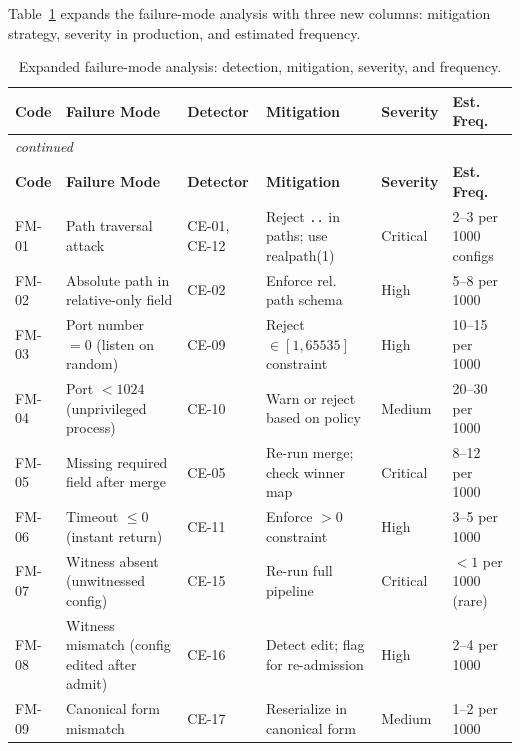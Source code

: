 Table~\ref{tab:failure-modes} expands the failure-mode analysis with three
new columns: mitigation strategy, severity in production, and estimated frequency.

\begin{longtable}{@{}p{1.5cm}p{2.0cm}p{2.2cm}p{2.0cm}p{2.0cm}p{2.2cm}@{}}
\caption{Expanded failure-mode analysis: detection, mitigation, severity, and frequency.}
\label{tab:failure-modes} \\
\toprule
\textbf{Code} & \textbf{Failure Mode} & \textbf{Detector} & \textbf{Mitigation} & \textbf{Severity} & \textbf{Est. Freq.} \\
\midrule
\endfirsthead
\multicolumn{6}{l}{\small\textit{continued}} \\
\toprule
\textbf{Code} & \textbf{Failure Mode} & \textbf{Detector} & \textbf{Mitigation} & \textbf{Severity} & \textbf{Est. Freq.} \\
\midrule
\endhead

FM-01 & Path traversal attack & CE-01, CE-12 & Reject \texttt{..} in paths; use realpath(1) & Critical & 2--3 per 1000 configs \\

FM-02 & Absolute path in relative-only field & CE-02 & Enforce rel. path schema & High & 5--8 per 1000 \\

FM-03 & Port number $= 0$ (listen on random) & CE-09 & Reject $\in [1,65535]$ constraint & High & 10--15 per 1000 \\

FM-04 & Port $< 1024$ (unprivileged process) & CE-10 & Warn or reject based on policy & Medium & 20--30 per 1000 \\

FM-05 & Missing required field after merge & CE-05 & Re-run merge; check winner map & Critical & 8--12 per 1000 \\

FM-06 & Timeout $\leq 0$ (instant return) & CE-11 & Enforce $> 0$ constraint & High & 3--5 per 1000 \\

FM-07 & Witness absent (unwitnessed config) & CE-15 & Re-run full pipeline & Critical & $< 1$ per 1000 (rare) \\

FM-08 & Witness mismatch (config edited after admit) & CE-16 & Detect edit; flag for re-admission & High & 2--4 per 1000 \\

FM-09 & Canonical form mismatch & CE-17 & Reserialize in canonical form & Medium & 1--2 per 1000 \\


\end{longtable}
